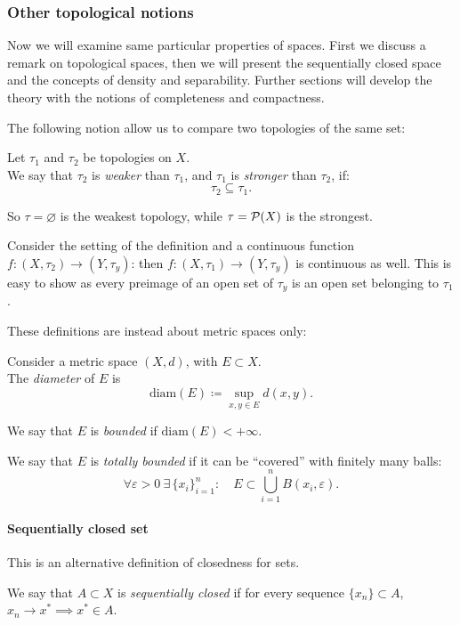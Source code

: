 \subsubsection{Other topological notions}
Now we will examine same particular properties of spaces. First we discuss a remark on topological spaces, then we will present the sequentially closed space and the concepts of density and separability. Further sections will develop the theory with the notions of completeness and compactness.

The following notion allow us to compare two topologies of the same set:
\begin{defn}
	Let $\tau_1$ and $\tau_2$ be topologies on $X$.\\
	We say that $\tau_2$ is \emph{weaker} than $\tau_1$, and $\tau_1$ is \emph{stronger} than $\tau_2$, if: $$\tau_2 \subseteq \tau_1.$$
\end{defn}

So $\tau = \varnothing$ is the weakest topology, while $\tau = \mathcal P(X)$ is the strongest.

Consider the setting of the definition and a continuous function $f:(X,\tau_2) \to (Y, \tau_y)$: then $f:(X,\tau_1) \to (Y, \tau_y)$ is continuous as well. This is easy to show as every preimage of an open set of $\tau_y$ is an open set belonging to $\tau_1$.

These definitions are instead about metric spaces only:
\begin{defn}\label{metric-totally-bounded}
	Consider a metric space $\left(X,d\right)$, with $E\subset X$.\\
	The \emph{diameter} of $E$ is $$\text{diam}(E)\coloneqq \sup_{x,y\in E}d(x,y).$$

	We say that $E$ is \emph{bounded} if $\text{diam}(E) < + \infty$.

	We say that $E$ is \emph{totally bounded} if it can be ``covered'' with finitely many balls:
	$$\forall \varepsilon > 0 \ \exists \, \{x_i\}_{i = 1}^n : \quad E\subset \bigcup_{i=1}^{n}B(x_i, \varepsilon).$$
\end{defn}

\paragraph{Sequentially closed set} This is an alternative definition of closedness for sets.
\begin{defn}
	We say that $A \subset X$ is \emph{sequentially closed} if for every sequence $\{ x_n \} \subset A$, $x_n \to x^* \implies x^* \in A$.
\end{defn}

